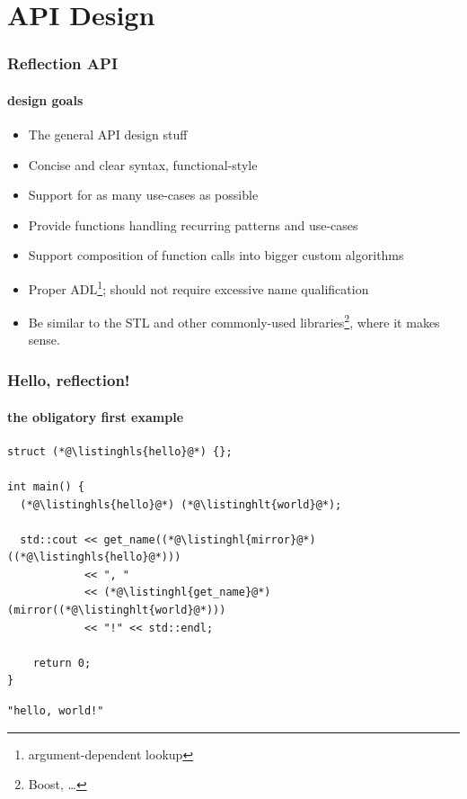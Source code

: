 \documentclass[aspectratio=169,compress,table,xcolor=table]{beamer}
\begin{document}
\section{API Design}
\begin{frame}
  \frametitle{Reflection API}
  \framesubtitle{design goals}
  \larger
  \begin{itemize}
    \item The general API design stuff
    \item Concise and clear syntax, functional-style
    \item Support for as many use-cases as possible
    \item Provide functions handling recurring patterns and use-cases
    \item Support composition of function calls into bigger custom algorithms
    \item Proper ADL\footnote{argument-dependent lookup}; should not require
      excessive name qualification
    \item Be similar to the STL and other commonly-used libraries\footnote{
        Boost, \ldots}, where it makes sense.
  \end{itemize}
\end{frame}
\begin{frame}[fragile]
  \frametitle{Hello, reflection!}
  \framesubtitle{the obligatory first example}
  \begin{lstlisting}[language=c++2x,basicstyle=\large\ttfamily]
struct (*@\listinghls{hello}@*) {};

int main() {
  (*@\listinghls{hello}@*) (*@\listinghlt{world}@*);

  std::cout << get_name((*@\listinghl{mirror}@*)((*@\listinghls{hello}@*)))
            << ", "
            << (*@\listinghl{get_name}@*)(mirror((*@\listinghlt{world}@*)))
            << "!" << std::endl;

    return 0;
}
  \end{lstlisting}
  \begin{verbatim}
"hello, world!"
  \end{verbatim}
\end{frame}
\end{document}
